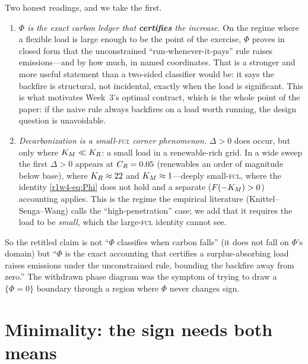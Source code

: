 \begin{remark}\label{r1w4-rem:whatphifor}
Two honest readings, and we take the first.
\begin{enumerate}
\item \emph{$\Phi$ is the exact carbon ledger that \textbf{certifies} the increase.} On the
regime where a flexible load is large enough to be the point of the exercise, $\Phi$ proves
in closed form that the unconstrained ``run-whenever-it-pays'' rule raises emissions---and by
how much, in named coordinates. That is a stronger and more useful statement than a two-sided
classifier would be: it says the backfire is structural, not incidental, exactly when the
load is significant. This is what motivates Week~3's optimal contract, which is the whole
point of the paper: if the naive rule always backfires on a load worth running, the design
question is unavoidable.
\item \emph{Decarbonization is a small-\textsc{fcl} corner phenomenon.} $\Delta>0$ does occur,
but only where $K_M\ll K_R$: a small load in a renewable-rich grid. In a wide sweep the first
$\Delta>0$ appears at $C_R=0.05$ (renewables an order of magnitude below base), where
$K_R\approx22$ and $K_M\approx1$---deeply small-\textsc{fcl}, where the identity
\eqref{r1w4-eq:Phi} does not hold and a separate ($F(-K_M)>0$) accounting applies. This is the
regime the empirical literature (Knittel--Senga--Wang) calls the ``high-penetration'' case;
we add that it requires the load to be \emph{small}, which the large-\textsc{fcl} identity
cannot see.
\end{enumerate}
So the retitled claim is not ``$\Phi$ classifies when carbon falls'' (it does not fall on
$\Phi$'s domain) but ``$\Phi$ is the exact accounting that certifies a surplus-absorbing load
raises emissions under the unconstrained rule, bounding the backfire away from zero.'' The
withdrawn phase diagram was the symptom of trying to draw a
$\{\Phi=0\}$ boundary through a region where $\Phi$ never changes sign.
\end{remark}



\section{Minimality: the sign needs both means}\label{r1w4-sec:minimal}

